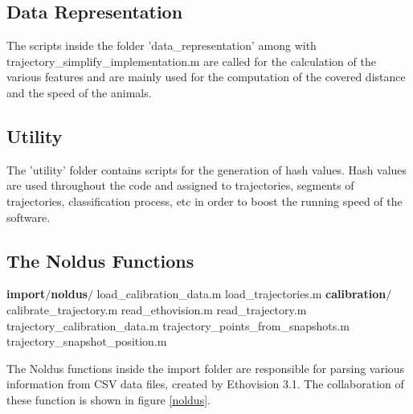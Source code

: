 \documentclass[12pt,titlepage]{article}
\newcommand\tab[1][1cm]{\hspace*{#1}}
\begin{document}
\begin{doublespace}
\subsection{Data Representation}
The scripts inside the folder 'data\_representation' among with trajectory\_simplify\_implementation.m are called for the calculation of the various features and are mainly used for the computation of the covered distance and the speed of the animals.

\subsection{Utility}
The 'utility' folder contains scripts for the generation of hash values. Hash values are used throughout the code and assigned to trajectories, segments of trajectories, classification process, etc in order to boost the running speed of the software.

\subsection{The Noldus Functions}

\textbf{import$/$noldus$/$}\linebreak
\tab load\_calibration\_data.m\linebreak
\tab load\_trajectories.m\linebreak
\textbf{\tab calibration$/$}\linebreak
\tab\tab calibrate\_trajectory.m\linebreak
\tab\tab read\_ethovision.m\linebreak
\tab\tab read\_trajectory.m\linebreak
\tab\tab trajectory\_calibration\_data.m\linebreak
\tab\tab trajectory\_points\_from\_snapshots.m\linebreak
\tab\tab trajectory\_snapshot\_position.m\linebreak

The Noldus functions inside the import folder are responsible for parsing various information from CSV data files, created by Ethovision 3.1. The collaboration of these function is shown in figure \ref{noldus}.


\end{doublespace}
\end{document}
